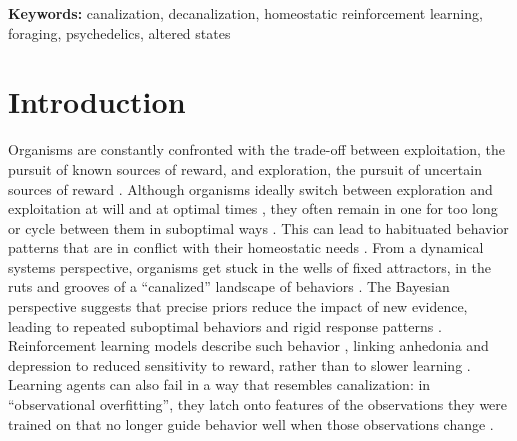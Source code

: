 \documentclass[12pt,fleqn]{article}
\begin{document}
\vspace{0.5em}
\noindent\textbf{Keywords:} canalization, decanalization, homeostatic reinforcement learning, foraging, psychedelics, altered states

\section{Introduction}

Organisms are constantly confronted with the trade-off between exploitation, the pursuit of known sources of reward, and exploration, the pursuit of uncertain sources of reward \citep{stephens_foraging_1986}. Although organisms ideally switch between exploration and exploitation at will and at optimal times \citep{pearson_decision_2014}, they often remain in one for too long or cycle between them in suboptimal ways \citep{barack_neurocomputational_2016, addicott_primer_2017}. This can lead to habituated behavior patterns that are in conflict with their homeostatic needs \citep{bernard_lectures_1974}. From a dynamical systems perspective, organisms get stuck in the wells of fixed attractors, in the ruts and grooves of a ``canalized'' landscape of behaviors \citep{waddington_canalization_1959, carhart-harris_canalization_2023}. The Bayesian perspective suggests that precise priors reduce the impact of new evidence, leading to repeated suboptimal behaviors and rigid response patterns \citep{carhart-harris_rebus_2019, carhart-harris_canalization_2023}. Reinforcement learning models describe such behavior \citep{sutton_reinforcement_1998}, linking anhedonia and depression to reduced sensitivity to reward, rather than to slower learning \citep{huys_mapping_2013}. Learning agents can also fail in a way that resembles canalization: in ``observational overfitting'', they latch onto features of the observations they were trained on that no longer guide behavior well when those observations change \citep{song_observational_2019}.
\end{document}
